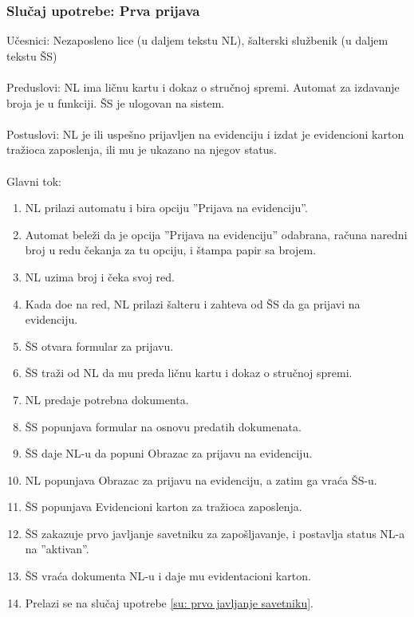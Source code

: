 \subsubsection{Slu\v caj upotrebe: Prva prijava}
\label{su: prva prijava}

\noindent U\v cesnici: Nezaposleno lice (u daljem tekstu NL), \v salterski slu\v zbenik (u daljem tekstu \v SS)
\\
\\ Preduslovi: NL ima li\v cnu kartu i dokaz o stru\v cnoj spremi. Automat za izdavanje broja je u funkciji. \v SS je ulogovan na sistem. 
\\
\\ Postuslovi: NL je ili uspe\v sno prijavljen na evidenciju i izdat je evidencioni karton tra\v zioca zaposlenja, ili mu je ukazano na njegov status.
\\
\\ Glavni tok:
\begin{enumerate}
	\item NL prilazi automatu i bira opciju ''Prijava na evidenciju''.
	\item Automat bele\v zi da je opcija ''Prijava na evidenciju'' odabrana, ra\v cuna naredni broj u redu \v cekanja za tu opciju, i \v stampa papir sa brojem.
	\item NL uzima broj i \v ceka svoj red.
	\item Kada do\dj e na red, NL prilazi \v salteru i zahteva od \v SS da ga prijavi na evidenciju.
	\item \v SS otvara formular za prijavu.
	\item \v SS tra\v zi od NL da mu preda li\v cnu kartu i dokaz o stru\v cnoj spremi.
	\item NL predaje potrebna dokumenta. 
	\item \v SS popunjava formular na osnovu predatih dokumenata.
	\item \v SS daje NL-u da popuni Obrazac za prijavu na evidenciju.
	\item NL popunjava Obrazac za prijavu na evidenciju, a zatim ga vra\' ca \v SS-u.
	\item \v SS popunjava Evidencioni karton za tra\v zioca zaposlenja.
	\item \v SS zakazuje prvo javljanje savetniku za zapo\v sljavanje, i postavlja status NL-a na ''aktivan''.
	\item \v SS vra\' ca dokumenta NL-u i daje mu evidentacioni karton.
	\item Prelazi se na slu\v caj upotrebe \ref{su: prvo javljanje savetniku}.
\end{enumerate}

